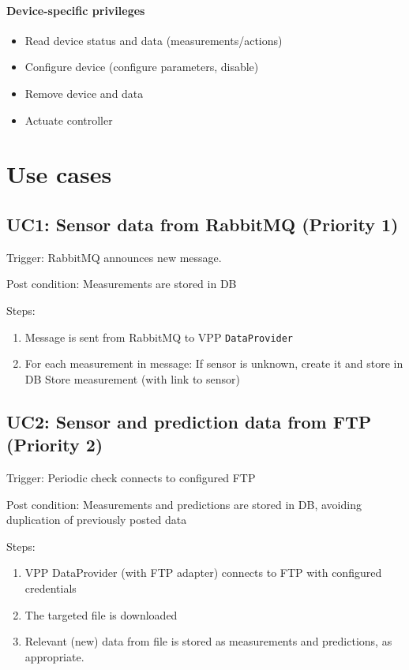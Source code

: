 \paragraph{Device-specific privileges}
\begin{itemize}
    \item{Read device status and data (measurements/actions)}
    \item{Configure device (configure parameters, disable)}
    \item{Remove device and data}
    \item{Actuate controller}
\end{itemize}

\section{Use cases}

\subsection*{UC1: Sensor data from RabbitMQ (Priority 1)}
\noindent Trigger: RabbitMQ announces new message.

\noindent Post condition: Measurements are stored in DB

\noindent Steps: 
\begin{enumerate}
    \item Message is sent from RabbitMQ to VPP \texttt{DataProvider}
    \item For each measurement in message:
        \subitem If sensor is unknown, create it and store in DB
        \subitem Store measurement (with link to sensor)
\end{enumerate}


\subsection*{UC2: Sensor and prediction data from FTP (Priority 2)}
\noindent Trigger: Periodic check connects to configured FTP

\noindent Post condition: Measurements and predictions are stored in DB, avoiding duplication of previously posted data

\noindent Steps: 
\begin{enumerate}
    \item VPP DataProvider (with FTP adapter) connects to FTP with configured credentials
    \item The targeted file is downloaded
    \item Relevant (new) data from file is stored as measurements and predictions, as appropriate.
\end{enumerate}

